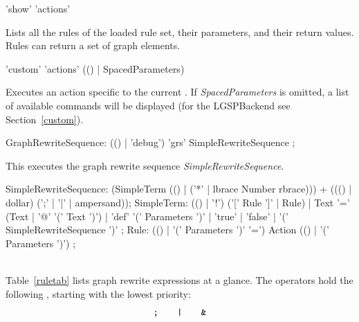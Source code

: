 \begin{rail}
  'show' 'actions'
\end{rail}
Lists all the rules of the loaded rule set, their parameters, and their return values. Rules can return a set of graph elements.

\begin{rail}
  'custom' 'actions' (() | SpacedParameters)
\end{rail}
Executes an action specific to the current . If \emph{SpacedParameters} is omitted, a list of available commands will be displayed (for the LGSPBackend see Section~\ref{custom}).

\makeatletter
\begin{rail}
  GraphRewriteSequence: (() | 'debug') 'grs' SimpleRewriteSequence ;
\end{rail}
This executes the graph rewrite sequence \emph{SimpleRewriteSequence}.
\begin{rail}
  SimpleRewriteSequence: (SimpleTerm (() | ('*' | lbrace Number rbrace))) + ((() | dollar) (';' | '|' | ampersand));
  SimpleTerm: (() | '!') ('[' Rule ']' | Rule) |
    Text '=' (Text | '@' '(' Text ')') |
    'def' '(' Parameters ')' |
    'true' |
    'false' |
    '(' SimpleRewriteSequence ')' ;
  Rule: (() | '(' Parameters ')' '=') Action (() | '(' Parameters ')') ;
\end{rail}
\makeatother
\mbox{\quad}\\
Table~\ref{ruletab} lists graph rewrite expressions at a glance. The operators hold the following , starting with the lowest priority: 
\[ \text{\texttt{;}} \;\;\;\;\;\;\; \text{\texttt{|}} \;\;\;\;\;\;\;  \text{\texttt{\&}}\] 
\makeatletter
